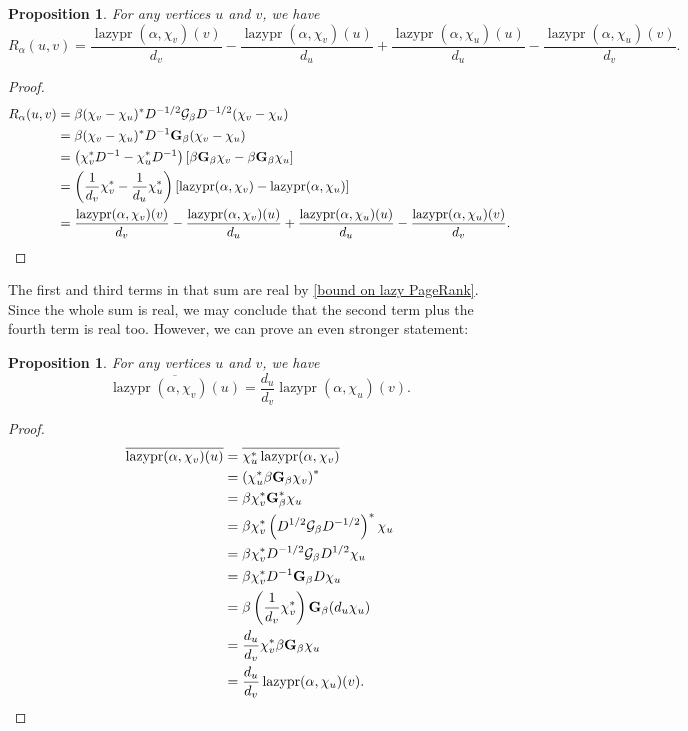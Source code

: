 \documentclass[12pt]{article}
\newtheorem{prop}[thm]{Proposition}
\theoremstyle{definition}
\DeclareMathOperator{\lazypr}{lazypr}
\newcommand{\green}{\mathcal{G}}
\newcommand{\asymgreen}{\normalfont{\textbf{G}}}
\begin{document}
\begin{prop}
For any vertices $u$ and $v$, we have $$R_\alpha(u, v) = \frac{\lazypr(\alpha, \chi_v)(v)}{d_v} - \frac{\lazypr(\alpha, \chi_v)(u)}{d_u} + \frac{\lazypr(\alpha, \chi_u)(u)}{d_u} - \frac{\lazypr(\alpha, \chi_u)(v)}{d_v}.$$
\end{prop}
\begin{proof}
\begin{align*}
R_\alpha(u, v) &= \beta (\chi_v - \chi_u)^* D^{-1/2} \green_\beta D^{-1/2} (\chi_v - \chi_u) \\
&= \beta (\chi_v - \chi_u)^* D^{-1} \asymgreen_\beta (\chi_v - \chi_u) \\
&= \left( \chi_v^* D^{-1} - \chi_u^* D^{-1} \right) \left[ \beta \asymgreen_\beta \chi_v - \beta \asymgreen_\beta \chi_u \right] \\
&= \left( \frac{1}{d_v} \chi_v^* - \frac{1}{d_u} \chi_u^* \right) \left[ \lazypr(\alpha, \chi_v) - \lazypr(\alpha, \chi_u) \right] \\
&= \frac{\lazypr(\alpha, \chi_v)(v)}{d_v} - \frac{\lazypr(\alpha, \chi_v)(u)}{d_u} + \frac{\lazypr(\alpha, \chi_u)(u)}{d_u} - \frac{\lazypr(\alpha, \chi_u)(v)}{d_v}.
\end{align*}
\end{proof}

The first and third terms in that sum are real by \cref{bound on lazy PageRank}. Since the whole sum is real, we may conclude that the second term plus the fourth term is real too. However, we can prove an even stronger statement:

\begin{prop}
For any vertices $u$ and $v$, we have
$$
\overline{\lazypr(\alpha, \chi_v)(u)} = \frac{d_u}{d_v} \lazypr(\alpha, \chi_u)(v).
$$
\end{prop}
\begin{proof}
\begin{align*}
\overline{\lazypr(\alpha, \chi_v)(u)} &= \overline{\chi_u^* \lazypr(\alpha, \chi_v)} \\
&= \left( \chi_u^* \beta \asymgreen_\beta \chi_v \right)^* \\
&= \beta \chi_v^* \asymgreen_\beta^* \chi_u \\
&= \beta \chi_v^* \left( D^{1/2} \green_\beta D^{-1/2} \right)^* \chi_u \\
&= \beta \chi_v^* D^{-1/2} \green_\beta D^{1/2} \chi_u \\
&= \beta \chi_v^* D^{-1} \asymgreen_\beta D \chi_u \\
&= \beta \left( \frac{1}{d_v} \chi_v^* \right) \asymgreen_\beta (d_u \chi_u) \\
&= \frac{d_u}{d_v} \chi_v^* \beta \asymgreen_\beta \chi_u \\
&= \frac{d_u}{d_v} \lazypr(\alpha, \chi_u)(v).
\end{align*}
\end{proof}
\end{document}
